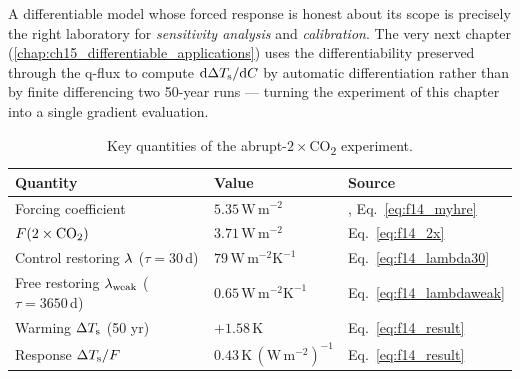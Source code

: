 \begin{remark}
A differentiable model whose forced response is honest about its scope is
precisely the right laboratory for \emph{sensitivity analysis} and
\emph{calibration}. The very next chapter
(\ref{chap:ch15_differentiable_applications}) uses the differentiability
preserved through the q-flux to compute $\mathrm{d}\Delta T_{\mathrm{s}}/\mathrm{d}C$ by
automatic differentiation rather than by finite differencing two 50-year runs ---
turning the experiment of this chapter into a single gradient evaluation.
\end{remark}

\begin{table}[ht]
\centering
\caption{Key quantities of the abrupt-$2\times$CO\textsubscript{2} experiment.}
\begin{tabular}{lll}
\toprule
Quantity & Value & Source \\
\midrule
Forcing coefficient & $5.35\,\mathrm{W\,m^{-2}}$ & \citet{myhre1998}, Eq.~\eqref{eq:f14_myhre} \\
$F(2\times\text{CO}_2)$ & $3.71\,\mathrm{W\,m^{-2}}$ & Eq.~\eqref{eq:f14_2x} \\
Control restoring $\lambda$ ($\tau{=}30\,$d) & $79\,\mathrm{W\,m^{-2}K^{-1}}$ & Eq.~\eqref{eq:f14_lambda30} \\
Free restoring $\lambda_{\mathrm{weak}}$ ($\tau{=}3650\,$d) & $0.65\,\mathrm{W\,m^{-2}K^{-1}}$ & Eq.~\eqref{eq:f14_lambdaweak} \\
Warming $\Delta T_{\mathrm{s}}$ (50 yr) & $+1.58\,\mathrm{K}$ & Eq.~\eqref{eq:f14_result} \\
Response $\Delta T_{\mathrm{s}}/F$ & $0.43\,\mathrm{K\,(W\,m^{-2})^{-1}}$ & Eq.~\eqref{eq:f14_result} \\
\bottomrule
\end{tabular}
\end{table}

